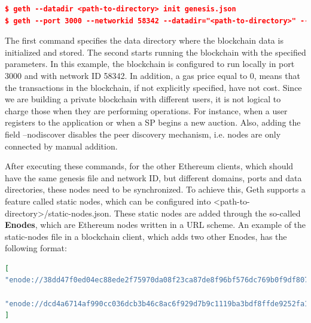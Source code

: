 \begin{lstlisting}[language=JSON,caption={Example of the two Geth commands used to start running the blockchain.}, label={lst:GethCommands}]
$ geth --datadir <path-to-directory> init genesis.json
$ geth --port 3000 --networkid 58342 --datadir="<path-to-directory>" --maxpeers=3 --rpc --rpcport 8545 --rpcaddr 127.0.0.1 --rpccorsdomain "http://localhost:8000" --rpcapi "eth,net,web3,personal" --gasprice "0" --nodiscover console
\end{lstlisting}

The first command specifies the data directory where the blockchain data is initialized and stored. The second starts running the blockchain with the specified parameters. In this example, the blockchain is configured to run locally in port 3000 and with network ID 58342. In addition, a gas price equal to 0, means that the transactions in the blockchain, if not explicitly specified, have not cost. Since we are building a private blockchain with different users, it is not logical to charge those when they are performing operations. For instance, when a user registers to the application or when a SP begins a new auction. Also, adding the field --nodiscover disables the peer discovery mechanism, i.e. nodes are only connected by manual addition. 

After executing these commands, for the other Ethereum clients, which should have the same genesis file and network ID, but different domains, ports and data directories, these nodes need to be synchronized. To achieve this, Geth supports a feature called static nodes, which can be configured into <path-to-directory>/static-nodes.json. These static nodes are added through the so-called \textbf{Enodes}, which are Ethereum nodes written in a URL scheme. An example of the static-nodes file in a blockchain client, which adds two other Enodes, has the following format:
\newline

\begin{lstlisting}[language=JSON,caption={Example of a static-nodes.json file that adds two other blockchain nodes}, label={lst:ENodes}]
[
"enode://38dd47f0ed04ec88ede2f75970da08f23ca87de8f96bf576dc769b0f9df807782d3729bc83b99042a3eb193ff 091cb4715a0906e5e902fb5adc04af91f3a7ba7@[::]:3010?discport=0",

"enode://dcd4a6714af990cc036dcb3b46c8ac6f929d7b9c1119ba3bdf8ffde9252fa17204bac84c3afae9c53b38c4a 0dacccd2c52ac832ec723c5ff5e29546402c09737@[::]:3015?discport=0"
]
\end{lstlisting}



